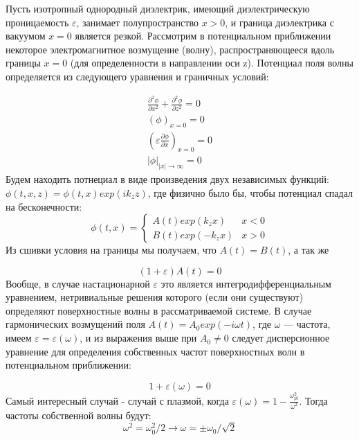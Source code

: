 \documentclass[10pt, a4paper]{article}
\begin{document}
Пусть изотропный однородный диэлектрик, имеющий диэлектрическую проницаемость $\varepsilon$, занимает полупространство $x > 0$, и граница диэлектрика с вакуумом $x = 0$ является резкой. Рассмотрим в потенциальном приближении некоторое электромагнитное возмущение (волну), распространяющееся вдоль границы $x = 0$ (для определенности в направлении оси z). Потенциал поля волны определяется из следующего уравнения и граничных условий:

\begin{align*}
	\frac{\partial^2 \phi}{\partial x^2} + \frac{\partial^2 \phi}{\partial z^2}=0 \\
	(\phi)_{x=0}=0 \\
	(\varepsilon \frac{\partial \phi}{\partial x})_{x=0} =0 \\
	|\phi|_{|x| \rightarrow \infty}=0
\end{align*}
Будем находить потнециал в виде произведения двух независимых функций: $\phi(t,x,z)=\phi(t,x)exp(i k_z z)$, где физично было бы, чтобы потенциал спадал на бесконечности:
\begin{equation}
	\phi(t,x)=\begin{cases}
		A(t)exp(k_z x) & \text{$x<0$}  \\
		B(t)exp(-k_z x) & \text{$x>0$}
	\end{cases}
\end{equation}
Из сшивки условия на границы мы получаем, что $A(t)=B(t)$, а так же 

\begin{equation}
	(1+\varepsilon) A(t)=0
\end{equation}
Вообще, в случае настационарной $\varepsilon$ это является интегродифференциальным уравнением, нетривиальные решения которого (если они существуют) определяют поверхностные волны в рассматриваемой системе.
В случае гармонических возмущений поля $A(t) = A_0 exp( -i \omega t)$, где $\omega$ — частота, имеем $\varepsilon = \varepsilon(\omega)$, и из выражения выше при $A_0 \neq 0$ следует дисперсионное уравнение
для определения собственных частот поверхностных волн в потенциальном
приближении:

\begin{equation}
	1+\varepsilon(\omega)=0
\end{equation}
Самый интересный случай - случай с плазмой, когда $\varepsilon(\omega)=1-\frac{\omega_{pl}^2}{\omega^2}$. Тогда частоты собственной волны будут:
\begin{equation}
		\omega^2=\omega_0^2 /2 \rightarrow \omega= \pm \omega_0 / \sqrt{2}
\end{equation}
\end{document}
